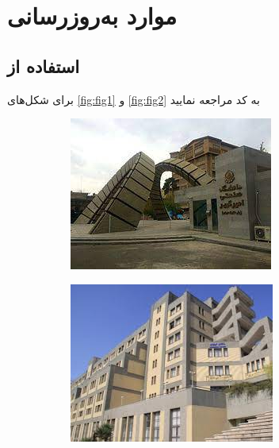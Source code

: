 \chapter{موارد به‌روزرسانی}
\section{ استفاده از }
برای شکل‌های 
\ref{fig:fig1} و \ref{fig:fig2}
به کد مراجعه نمایید
\begin{figure}[h!]
		\centering %
		\begin{subfigure}{0.33\textwidth}
			\includegraphics[width=\linewidth]{Images/Chapter6/test1.jpg}
			\caption{}
			\label{f61}
		\end{subfigure}\hfil %
		\begin{subfigure}{0.33\textwidth}
			\includegraphics[width=\linewidth]{Images/Chapter6/test2.jpg}

\end{subfigure}
\end{figure}
